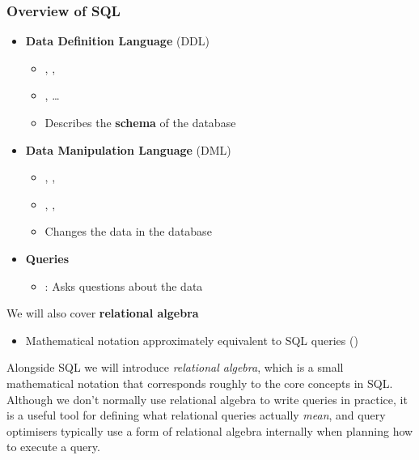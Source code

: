 \begin{frame}
    \label{s:sql-parts}
    \frametitle{Overview of SQL}
    \begin{itemize}
        \item \textbf{Data Definition Language} (DDL)
            \begin{itemize}
                \item {}, , 
                \item {}, \dots
                \item Describes the \textbf{schema} of the database\\[1em]\pause
            \end{itemize}
        \item \textbf{Data Manipulation Language} (DML)
            \begin{itemize}
                \item {}, , 
                \item {}, , 
                \item Changes the data in the database\\[1em]\pause
            \end{itemize}
        \item \textbf{Queries}
            \begin{itemize}
                \item {}: Asks questions about the data\\[1em]
            \end{itemize}
    \end{itemize}
    We will also cover \textbf{relational algebra}
    \begin{itemize}
        \item Mathematical notation approximately equivalent to SQL queries ()
    \end{itemize}
\end{frame}
\label{l:sql-parts}

Alongside SQL we will introduce \emph{relational algebra}, which is a small mathematical notation that corresponds roughly to the core concepts in SQL.
Although we don't normally use relational algebra to write queries in practice, it is a useful tool for defining what relational queries actually \emph{mean}, and query optimisers typically use a form of relational algebra internally when planning how to execute a query.

